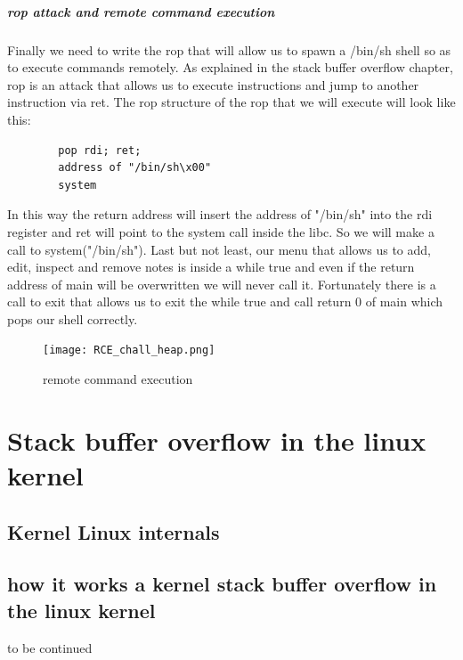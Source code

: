 \documentclass{report}
\begin{document}
    \paragraph{rop attack and remote command execution}
    Finally we need to write the rop that will allow us to spawn a /bin/sh shell so as to execute commands remotely.\newline
    As explained in the stack buffer overflow chapter, rop is an attack that allows us to execute instructions and jump to another instruction via ret.\newline
    The rop structure of the rop that we will execute will look like this:
    \begin{verbatim}
        pop rdi; ret;
        address of "/bin/sh\x00"
        system 
    \end{verbatim}
    In this way the return address will insert the address of "/bin/sh" into the rdi register and ret will point to the system call inside the libc.\newline
    So we will make a call to system("/bin/sh").\newline
    Last but not least, our menu that allows us to add, edit, inspect and remove notes is inside a while true and even if the return address of main will be overwritten we will never call it.\newline
    Fortunately there is a call to exit that allows us to exit the while true and call return 0 of main which pops our shell correctly.\newline
    \begin{figure}[htbp]
        \centering
        \texttt{[image: RCE\_chall\_heap.png]}
        \caption{remote command execution}
        \label{fig:enter-label}
    \end{figure}
    \clearpage
    \chapter{Stack buffer overflow in the linux kernel}
    \section{Kernel Linux internals}
    \section{how it works a kernel stack buffer overflow in the linux kernel}
    to be continued    
    \clearpage
\end{document}
